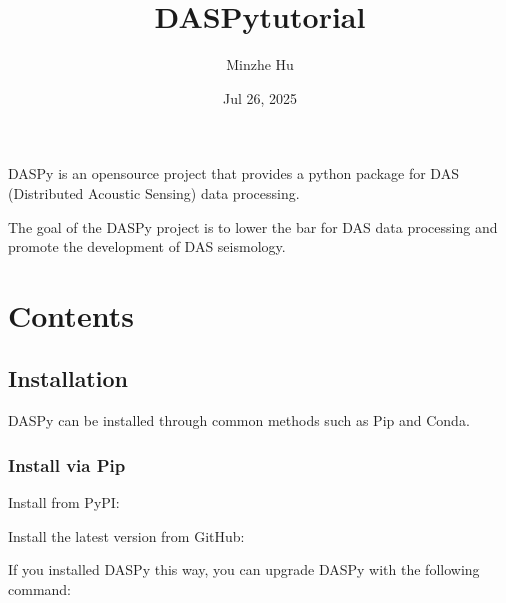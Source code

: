 \documentclass[letterpaper,10pt,english]{sphinxmanual}
\title{DASPy\sphinxhyphen{}tutorial}
\date{Jul 26, 2025}
\author{Minzhe Hu}
\let\sphinxpxdimen\pdfpxdimen\else\newdimen\sphinxpxdimen
\begin{document}
\pagestyle{empty}
\sphinxmaketitle
\pagestyle{plain}
\sphinxtableofcontents
\pagestyle{normal}
\label{\detokenize{index::doc}}


\sphinxAtStartPar
\sphinxincludegraphics[height=200\sphinxpxdimen]{{logo}.png}

\sphinxAtStartPar
DASPy is an open\sphinxhyphen{}source project that provides a python package for DAS (Distributed Acoustic Sensing) data processing.

\sphinxAtStartPar
The goal of the DASPy project is to lower the bar for DAS data processing and promote the development of DAS seismology.


\chapter{Contents}
\label{\detokenize{index:contents}}
\sphinxstepscope


\section{Installation}
\label{\detokenize{Installation:installation}}\label{\detokenize{Installation::doc}}
\sphinxAtStartPar
DASPy can be installed through common methods such as Pip and Conda.


\subsection{Install via Pip}
\label{\detokenize{Installation:install-via-pip}}
\sphinxAtStartPar
Install from PyPI:

\begin{sphinxVerbatim}[commandchars=\\\{\}]
  
\end{sphinxVerbatim}

\sphinxAtStartPar
Install the latest version from GitHub:

\begin{sphinxVerbatim}[commandchars=\\\{\}]
  
\end{sphinxVerbatim}

\sphinxAtStartPar
If you installed DASPy this way, you can upgrade DASPy with the following command:
\end{document}
